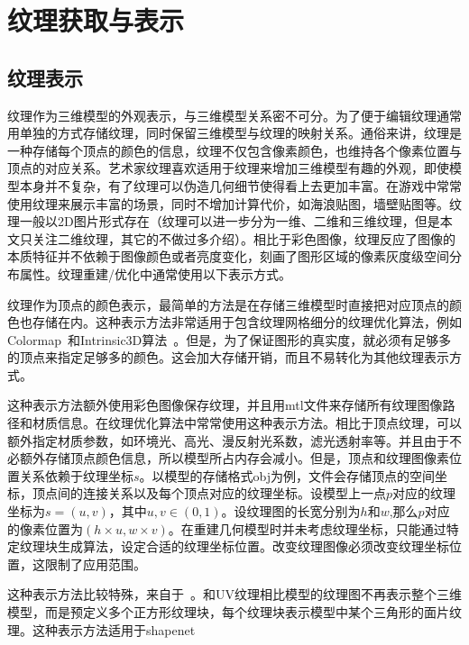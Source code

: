 %
%
\section{纹理获取与表示}
\subsection{纹理表示}
纹理作为三维模型的外观表示，与三维模型关系密不可分。为了便于编辑纹理通常用单独的方式存储纹理，同时保留三维模型与纹理的映射关系。通俗来讲，纹理是一种存储每个顶点的颜色的信息，纹理不仅包含像素颜色，也维持各个像素位置与顶点的对应关系。艺术家纹理喜欢适用于纹理来增加三维模型有趣的外观，即使模型本身并不复杂，有了纹理可以伪造几何细节使得看上去更加丰富。在游戏中常常使用纹理来展示丰富的场景，同时不增加计算代价，如海浪贴图，墙壁贴图等。纹理一般以2D图片形式存在（纹理可以进一步分为一维、二维和三维纹理，但是本文只关注二维纹理，其它的不做过多介绍）。相比于彩色图像，纹理反应了图像的本质特征并不依赖于图像颜色或者亮度变化，刻画了图形区域的像素灰度级空间分布属性。纹理重建/优化中通常使用以下表示方式。\par
\vspace*{2mm}纹理作为顶点的颜色表示，最简单的方法是在存储三维模型时直接把对应顶点的颜色也存储在内。这种表示方法非常适用于包含纹理网格细分的纹理优化算法，例如Colormap~\cite{zhou2014color}和Intrinsic3D算法~\cite{RobertMaier2017Intrinsic3DH3}。但是，为了保证图形的真实度，就必须有足够多的顶点来指定足够多的颜色。这会加大存储开销，而且不易转化为其他纹理表示方式。\par
\vspace*{2mm}这种表示方法额外使用彩色图像保存纹理，并且用mtl文件来存储所有纹理图像路径和材质信息。在纹理优化算法中常常使用这种表示方法。相比于顶点纹理，可以额外指定材质参数，如环境光、高光、漫反射光系数，滤光透射率等。并且由于不必额外存储顶点颜色信息，所以模型所占内存会减小。但是，顶点和纹理图像素位置关系依赖于纹理坐标$s$。以模型的存储格式obj为例，文件会存储顶点的空间坐标，顶点间的连接关系以及每个顶点对应的纹理坐标。设模型上一点$p$对应的纹理坐标为$s=(u,v)$，其中$u,v\in(0,1)$。设纹理图的长宽分别为$h\text{和}w$,那么$p$对应的像素位置为$(h\times u,w\times v)$。在重建几何模型时并未考虑纹理坐标，只能通过特定纹理块生成算法，设定合适的纹理坐标位置。改变纹理图像必须改变纹理坐标位置，这限制了应用范围。\par
\vspace*{2mm}这种表示方法比较特殊，来自于~\cite{ShichenLiu2019SoftRA}。和UV纹理相比模型的纹理图不再表示整个三维模型，而是预定义多个正方形纹理块，每个纹理块表示模型中某个三角形的面片纹理。这种表示方法适用于shapenet
